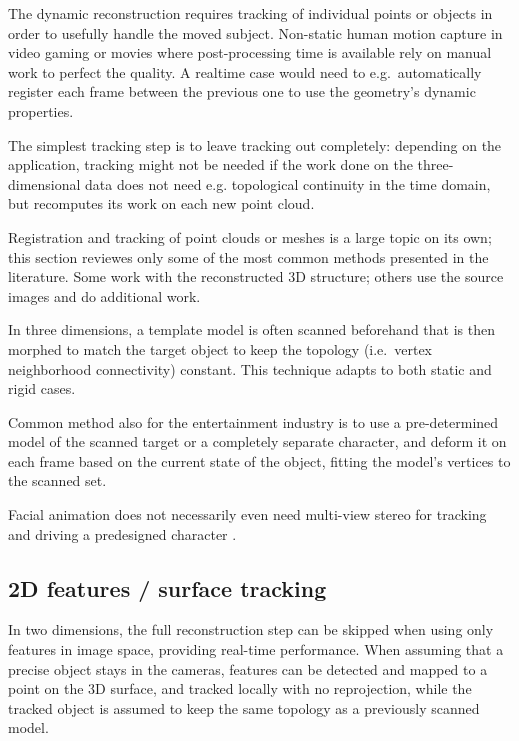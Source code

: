 The dynamic reconstruction requires tracking of individual points or objects in order to usefully handle the moved subject.
Non-static human motion capture in video gaming or movies where post-processing time is available rely on manual work to perfect the quality.
A realtime case would need to e.g.~automatically register each frame between the previous one to use the geometry's dynamic properties.

The simplest tracking step is to leave tracking out completely: depending on the application, tracking might not be needed if the work done on the three-dimensional data does not need e.g. topological continuity in the time domain, but recomputes its work on each new point cloud.

Registration and tracking of point clouds or meshes is a large topic on its own; this section reviewes only some of the most common methods presented in the literature.
Some work with the reconstructed 3D structure; others use the source images and do additional work.

In three dimensions, a template model is often scanned beforehand that is then morphed to match the target object to keep the topology (i.e.~vertex neighborhood connectivity) constant.
This technique adapts to both static and rigid cases.
\cite{bojsen2012tracking,li2009robust}

Common method also for the entertainment industry is to use a pre-determined model of the scanned target or a completely separate character, and deform it on each frame based on the current state of the object, fitting the model's vertices to the scanned set.

Facial animation does not necessarily even need multi-view stereo for tracking and driving a predesigned character \cite{chuang2002performance,deng2007computer}.


\subsection{2D features / surface tracking} %



In two dimensions, the full reconstruction step can be skipped when using only features in image space, providing real-time performance. \cite{pilet2005real}
When assuming that a precise object stays in the cameras, features can be detected and mapped to a point on the 3D surface, and tracked locally with no reprojection, while the tracked object is assumed to keep the same topology as a previously scanned model.

